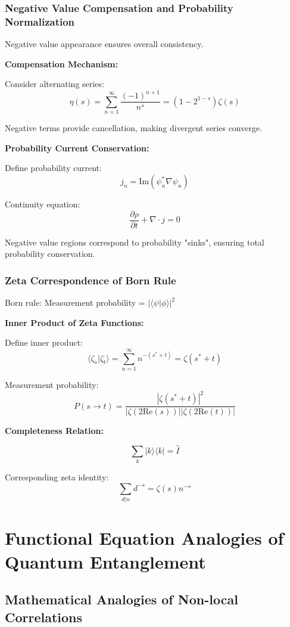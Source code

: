 \documentclass[11pt]{article}
\theoremstyle{plain}
\theoremstyle{definition}
\theoremstyle{remark}
\begin{document}
\subsubsection{Negative Value Compensation and Probability Normalization}

Negative value appearance ensures overall consistency.

\textbf{Compensation Mechanism:}

Consider alternating series:
$$\eta(s) = \sum_{n=1}^{\infty} \frac{(-1)^{n+1}}{n^s} = (1 - 2^{1-s}) \zeta(s)$$

Negative terms provide cancellation, making divergent series converge.

\textbf{Probability Current Conservation:}

Define probability current:
$$j_n = \text{Im}(\psi_n^* \nabla \psi_n)$$

Continuity equation:
$$\frac{\partial \rho}{\partial t} + \nabla \cdot j = 0$$

Negative value regions correspond to probability "sinks", ensuring total probability conservation.

\subsubsection{Zeta Correspondence of Born Rule}

Born rule: Measurement probability = $|\langle\psi|\phi\rangle|^2$

\textbf{Inner Product of Zeta Functions:}

Define inner product:
$$\langle \zeta_s | \zeta_t \rangle = \sum_{n=1}^{\infty} n^{-(s^* + t)} = \zeta(s^* + t)$$

Measurement probability:
$$P(s \to t) = \frac{|\zeta(s^* + t)|^2}{|\zeta(2\text{Re}(s))| |\zeta(2\text{Re}(t))|}$$

\textbf{Completeness Relation:}

$$\sum_{k} |k\rangle\langle k| = \hat{I}$$

Corresponding zeta identity:
$$\sum_{d|n} d^{-s} = \zeta(s) n^{-s}$$

\section{Functional Equation Analogies of Quantum Entanglement}

\subsection{Mathematical Analogies of Non-local Correlations}
\end{document}
